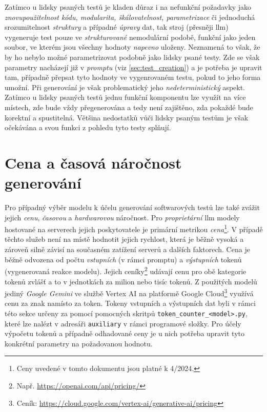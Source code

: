 \documentclass[czech, ma, kiv, he, iso690numb, pdf, viewonly]{fasthesis}
\begin{document}
        Zatímco u lidsky psaných testů je kladen důraz i na nefunkční požadavky jako \textit{znovupoužitelnost kódu, modularita, škálovatelnost, parametrizace} či jednoduchá srozumitelnost \textit{struktury} a případné \textit{úpravy} dat, tak stroj (přesněji \Gls{llm}) vygeneruje test pouze ve \textit{strukturované} nemodulární podobě, funkční jako jeden soubor, ve kterém jsou všechny hodnoty \textit{napevno} uloženy. Neznamená to však, že by ho nebylo možné parametrizovat podobně jako lidsky psané testy. Zde se však parametry nacházejí již v \emph{promptu} (viz \ref{sec:test_creation}) a je potřeba je upravit tam, případně přepsat tyto hodnoty ve vygenrovaném testu, pokud to jeho forma umožní. Při generování je však problematický jeho \textit{nedeterministický} aspekt. Zatímco u lidsky psaných testů jednu funkční komponentu lze využít na více místech, zde bude vždy přegenerována a tedy není zajištěno, zda pokaždé bude korektní a spustitelná. Většina nedostatků vůči lidsky psaným testům je však očekávána a svou funkci z pohledu  tyto testy splňují.

    \section{Cena a časová náročnost generování} \label{sec:price_and_requirements}

    Pro případný výběr modelu k účelu generování softwarových testů lze také zvážit jejich \textit{cenu}, \textit{časovou} a \textit{hardwarovou} náročnost. Pro \textit{proprietární} \Gls{llm} modely hostované na serverech jejich poskytovatele je primární metrikou \textit{cena}\footnote{Ceny uvedené v tomto dokumentu jsou platné k 4/2024.}. V případě těchto služeb není na místě hodnotit jejich rychlost, která je běžně vysoká a zároveň silně závisí na současném zatížení serverů a dalších faktorech. Cena je běžně odvozena od počtu \textit{vstupních} (v rámci promptu) a \textit{výstupních} tokenů (vygenerovaná reakce modelu). Jejich ceníky\footnote{Např. \url{https://openai.com/api/pricing/}} udávají cenu pro obě kategorie tokenů zvlášť a to v jednotkách za milion nebo tisíc tokenů. Z použitých modelů jediný \textit{Google Gemini} ve službě Vertex AI na platformě Google Cloud\footnote{Ceník: \url{https://cloud.google.com/vertex-ai/generative-ai/pricing}} využívá cenu za znak namísto za token. Tokeny vstupních a výstupních dat byli v rámci této sekce určeny za pomocí pomocných skritpů \verb|token_counter_<model>.py|, které lze nalézt v adresáři \verb|auxiliary| v rámci programové složky. Pro účely výpočetu tokenů a případně odhadované ceny je u nich potřeba upravit tyto konkrétní parametry na požadovanou hodnotu.
\end{document}
